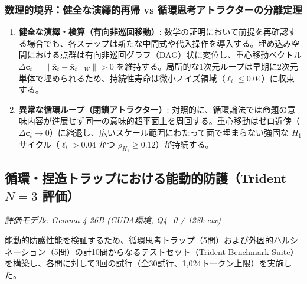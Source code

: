 \documentclass[11pt,a4paper]{article}
\begin{document}
\subsubsection{数理的境界：健全な演繹的再帰 vs 循環思考アトラクターの分離定理}
\begin{enumerate}
    \item \textbf{健全な演繹・検算（有向非巡回移動）}: 数学の証明において前提を再確認する場合でも、各ステップは新たな中間式や代入操作を導入する。埋め込み空間における点群は有向非巡回グラフ（DAG）状に変位し、重心移動ベクトル $\Delta \mathbf{c}_t = \|\bar{\mathbf{x}}_t - \bar{\mathbf{x}}_{t-W}\| > 0$ を維持する。局所的な1次元ループは早期に2次元単体で埋められるため、持続性寿命は微小ノイズ領域（$\ell_i \le 0.04$）に収束する。
    \item \textbf{異常な循環ループ（閉鎖アトラクター）}: 対照的に、循環論法では命題の意味内容が進展せず同一の意味的超平面上を周回する。重心移動はゼロ近傍（$\Delta \mathbf{c}_t \to 0$）に縮退し、広いスケール範囲にわたって面で埋まらない強固な $H_1$ サイクル（$\ell_i > 0.04$ かつ $\rho_{H_1} \ge 0.12$）が持続する。
\end{enumerate}

\subsection{循環・捏造トラップにおける能動的防護（Trident $N=3$ 評価）}
\textit{評価モデル: Gemma 4 26B (CUDA環境, Q4\_0 / 128k ctx)}

能動的防護性能を検証するため、循環思考トラップ（5問）および外因的ハルシネーション（5問）の計10問からなるテストセット（Trident Benchmark Suite）を構築し、各問に対して3回の試行（全30試行、1,024トークン上限）を実施した。
\end{document}
